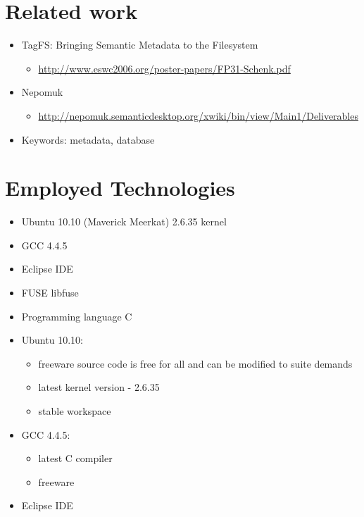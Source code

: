 \documentclass{beamer}
\begin{document}
\section{Related work}

\begin{frame}
  
  \begin{itemize}
  \item TagFS: Bringing Semantic Metadata to the Filesystem
    \begin{itemize}
    \item \url{http://www.eswc2006.org/poster-papers/FP31-Schenk.pdf}
    \end{itemize}
    
  \item Nepomuk
    \begin{itemize}
    \item \url{http://nepomuk.semanticdesktop.org/xwiki/bin/view/Main1/Deliverables}
    \end{itemize}
    
  \item Keywords: metadata, database
  \end{itemize}
  
\end{frame}

\section{Employed Technologies}

\begin{frame}
  \begin{itemize}
  \item Ubuntu 10.10 (Maverick Meerkat)  2.6.35 kernel
  \item GCC 4.4.5
  \item Eclipse IDE	
  \item FUSE  libfuse
  \item Programming language  C
  \end{itemize}
\end{frame}

\begin{frame}
  \begin{itemize}
  \item Ubuntu 10.10:
	\begin{itemize}  
	\item freeware  source code is free for all and can be modified to suite demands
	\item latest kernel version - 2.6.35 
	\item stable workspace
	\end{itemize}
  \item GCC 4.4.5:
	\begin{itemize} 	
	\item latest C compiler
	\item freeware
	\end{itemize}
  \item Eclipse IDE
  \end{itemize}
\end{frame}
\end{document}
